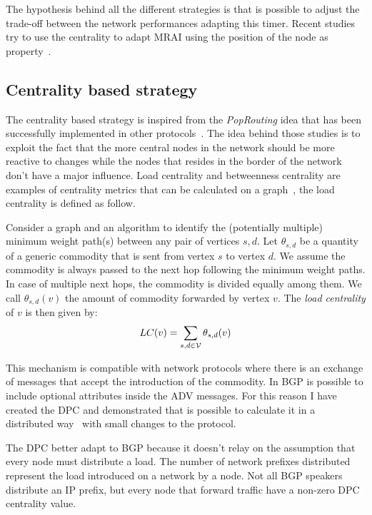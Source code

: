 The hypothesis behind all the different strategies is that is possible to
adjust the trade-off between the network performances adapting this timer.
Recent studies try to use the centrality to adapt \ac{MRAI} using the position
of the node as property~\cite{milani2020improving}.

\subsection{Centrality based strategy}
\label{subsec:bgp_mrai_dpc}

The centrality based strategy is inspired from the \textit{PopRouting} idea
that has been successfully implemented in other protocols~\cite{MaLo18_ToN,GhiMa18_infocom}.
The idea behind those studies is to exploit the fact that the more central nodes
in the network should be more reactive to changes while the nodes that resides
in the border of the network don't have a major influence.
Load centrality and betweenness centrality are examples of centrality metrics
that can be calculated on a graph~\cite{Brandes2008variants}, the load centrality
is defined as follow.

\begin{definition}
		Consider a graph \graph and an algorithm to identify the (potentially multiple)
		minimum weight path(s) between any pair of vertices $s,d$.
		Let $\theta_{s,d}$ be a quantity of a generic commodity that is sent from vertex
		$s$ to vertex $d$.
		We assume the commodity is always passed to the next hop following the minimum weight paths.
		In case of multiple next hops, the commodity is divided equally among them.
		We call $\theta_{s,d}(v)$ the amount of  commodity forwarded by vertex $v$.
		The \emph{load centrality} of $v$ is then given by:
		\begin{equation}
				LC(v) = \sum_{s,d \in \mathcal{V}}\theta_{s,d}(v)
				\label{eq:lc}
		\end{equation}
\end{definition}

This mechanism is compatible with network protocols where there is an exchange
of messages that accept the introduction of the commodity.
In \ac{BGP} is possible to include optional attributes inside the \ac{ADV} messages.
For this reason I have created the \ac{DPC} and demonstrated that is possible
to calculate it in a distributed way~\cite{milani2019BGP} with small changes
to the protocol.

The \ac{DPC} better adapt to \ac{BGP} because it doesn't relay on the assumption
that every node must distribute a load.
The number of network prefixes distributed represent the load introduced on a
network by a node.
Not all \ac{BGP} speakers distribute an \ac{IP} prefix, but every node that forward
traffic have a non-zero \ac{DPC} centrality value.

